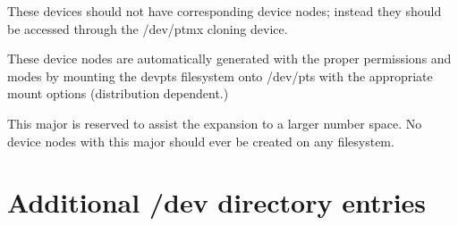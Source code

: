 \begin{devicelist}
	\minordots
\end{devicelist}

\begin{devicelist}
\end{devicelist}

\begin{devicelist}
\end{devicelist}

\begin{devicelist}
\end{devicelist}

\noindent
These devices should not have corresponding device nodes; instead they
should be accessed through the {\file /dev/ptmx} cloning device.

\begin{devicelist}
	\minordots
\end{devicelist}

\noindent
These device nodes are automatically generated with the proper
permissions and modes by mounting the {\file devpts} filesystem onto
{\file /dev/pts} with the appropriate mount options (distribution
dependent.)

\begin{devicelist}
\end{devicelist}

\begin{devicelist}
\end{devicelist}

\begin{devicelist}
\end{devicelist}

\noindent
This major is reserved to assist the expansion to a larger number
space.  No device nodes with this major should ever be created on any
filesystem.

\section{Additional /dev directory entries}

